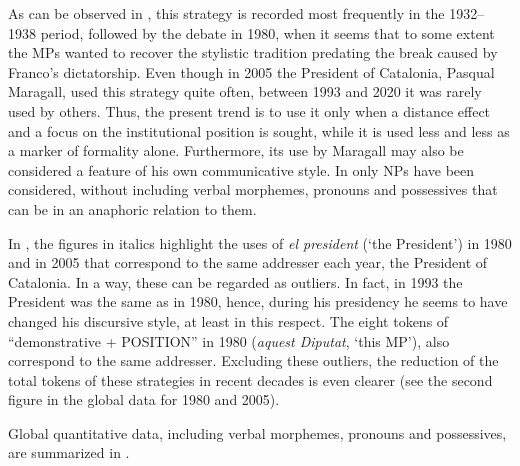 \documentclass[output=paper]{langscibook}
\begin{document}
As can be observed in , this strategy is recorded most frequently in the 1932–1938 period, followed by the debate in 1980, when it seems that to some extent the MPs wanted to recover the stylistic tradition predating the break caused by Franco’s dictatorship. Even though in 2005 the President of Catalonia, Pasqual Maragall, used this strategy quite often, between 1993 and 2020 it was rarely used by others. Thus, the present trend is to use it only when a distance effect and a focus on the institutional position is sought, while it is used less and less as a marker of formality alone. Furthermore, its use by Maragall may also be considered a feature of his own communicative style. In  only NPs have been considered, without including verbal morphemes, pronouns and possessives that can be in an anaphoric relation to them.

In , the figures in italics highlight the uses of \textit{el president} (‘the President’) in 1980 and in 2005 that correspond to the same addresser each year, the President of Catalonia. In a way, these can be regarded as outliers. In fact, in 1993 the President was the same as in 1980, hence, during his presidency he seems to have changed his discursive style, at least in this respect. The eight tokens of “demonstrative + POSITION” in 1980 (\textit{aquest Diputat}, ‘this MP’), also correspond to the same addresser. Excluding these outliers, the reduction of the total tokens of these strategies in recent decades is even clearer (see the second figure in the global data for 1980 and 2005).



Global quantitative data, including verbal morphemes, pronouns and possessives, are summarized in .
\end{document}
